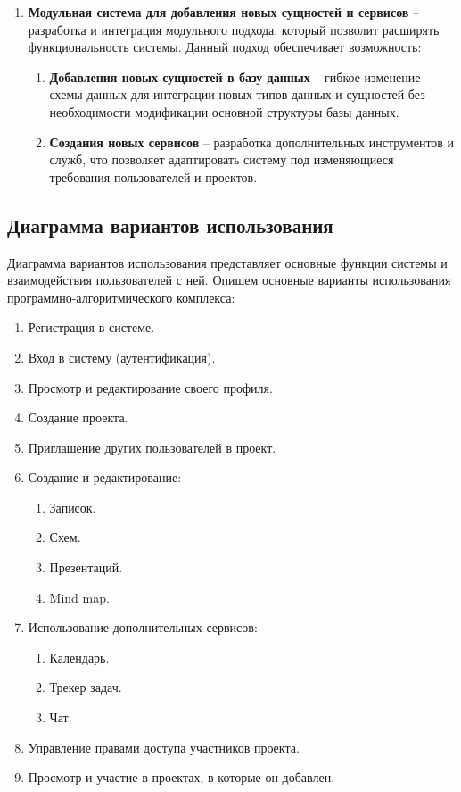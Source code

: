 \begin{enumerate}[wide=12.5mm, leftmargin=12.5mm]
    \item \textbf{Модульная система для добавления новых сущностей и сервисов} -- разработка и интеграция модульного подхода, который позволит расширять функциональность системы. Данный подход обеспечивает возможность:
    \begin{enumerate}[wide=12.5mm, leftmargin=12.5mm]
        \item \textbf{Добавления новых сущностей в базу данных} -- гибкое изменение схемы данных для интеграции новых типов данных и сущностей без необходимости модификации основной структуры базы данных.
        \item \textbf{Создания новых сервисов} -- разработка дополнительных инструментов и служб, что позволяет адаптировать систему под изменяющиеся требования пользователей и проектов.
    \end{enumerate}  
\end{enumerate}
\clearpage

\subsection{Диаграмма вариантов использования}

Диаграмма вариантов использования представляет основные функции системы и взаимодействия пользователей с ней. 
Опишем основные варианты использования программно-алгоритмического комплекса:

\begin{enumerate}[wide=12.5mm, leftmargin=12.5mm]
    \item Регистрация в системе.
    \item Вход в систему (аутентификация).
    \item Просмотр и редактирование своего профиля.
    \item Создание проекта.
    \item Приглашение других пользователей в проект.
    \item Создание и редактирование:
    \begin{enumerate}[wide=12.5mm, leftmargin=12.5mm]
        \item Записок.
        \item Схем.
        \item Презентаций.
        \item Mind map.
    \end{enumerate}
    \item Использование дополнительных сервисов:
    \begin{enumerate}[wide=12.5mm, leftmargin=12.5mm]
        \item Календарь.
        \item Трекер задач.
        \item Чат.
    \end{enumerate}
    \item Управление правами доступа участников проекта.
    \item Просмотр и участие в проектах, в которые он добавлен.
\end{enumerate}
\clearpage

